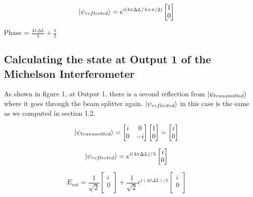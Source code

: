 \documentclass{article}
\begin{document}
\[\ket{\psi_{reflected}} = e^{i(4\pi\Delta{L}/\lambda + \pi/2)}\begin{bmatrix}
1\\
0\\
\end{bmatrix}\]

\begin{flushleft}
Phase = $\frac{4\pi\Delta{L}}{\lambda} + \frac{\pi}{2}$
\end{flushleft}



\subsection{Calculating the state at Output 1 of the Michelson Interferometer}
\hspace{\parindent} As shown in figure 1, at Output 1, there is a second reflection from $\ket{\psi_{transmitted}}$ where it goes through the beam splitter again. $\ket{\psi_{reflected}}$ in this case is the same as we computed in section 1.2.


\[\ket{\psi_{transmitted}} = \begin{bmatrix}
i&0\\
0&-i\\
\end{bmatrix}
\begin{bmatrix}
1\\
0\\
\end{bmatrix}
=
\begin{bmatrix}
i\\
0\\
\end{bmatrix}
\]

\[\ket{\psi_{reflected}} =e^{i(4\pi\Delta{L})/\lambda} \begin{bmatrix}
i\\
0\\
\end{bmatrix}
\]

\[E_{out} = \frac{1}{\sqrt{2}} \begin{bmatrix}
i\\
0\\
\end{bmatrix}
+
\frac{1}{\sqrt{2}} e^{i(4\pi\Delta{L})/\lambda} \begin{bmatrix}
i\\
0\\
\end{bmatrix}
\]
\end{document}
